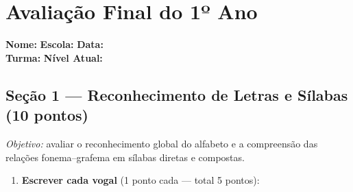 
\section{Avaliação Final do 1º Ano}

\begin{avaliacao}
\begin{center}
\end{center}

\vspace{0.5em}
\noindent\textbf{Nome:} \underline{\hspace{5cm}} \quad
\textbf{Escola:} \underline{\hspace{4cm}} \quad
\textbf{Data:} \underline{\hspace{2.5cm}}\\[0.5em]
\noindent\textbf{Turma:} \underline{\hspace{2cm}} \quad
\textbf{N\'{i}vel Atual:} \underline{\hspace{3cm}}

\subsection*{Seção 1 — Reconhecimento de Letras e Sílabas (10 pontos)}

\textit{Objetivo:} avaliar o reconhecimento global do alfabeto e a
compreensão das relações fonema--grafema em sílabas diretas e compostas.

\begin{enumerate}
  \item \textbf{Escrever cada vogal} (1 ponto cada — total 5 pontos):


\end{enumerate}
\end{avaliacao}
